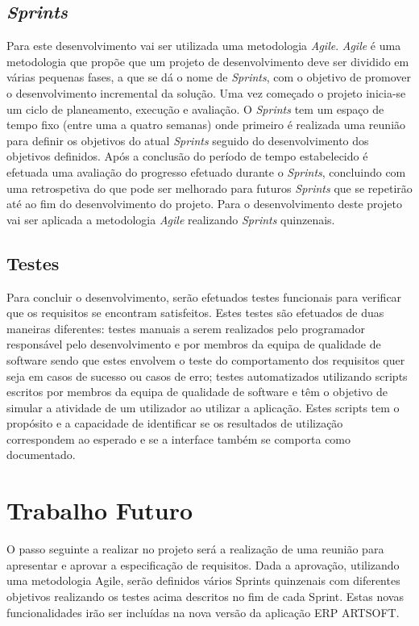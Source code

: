 \documentclass[sigplan]{acmart}
\begin{document}
\subsection{\textit{Sprints}}

Para este desenvolvimento vai ser utilizada uma metodologia \textit{Agile}. \textit{Agile} é uma metodologia que propõe que um projeto de desenvolvimento deve ser dividido em várias pequenas fases, a que se dá o nome de \textit{Sprints}, com o objetivo de promover o desenvolvimento incremental da solução. Uma vez começado o projeto inicia-se um ciclo de planeamento, execução e avaliação. O \textit{Sprints} tem um espaço de tempo fixo (entre uma a quatro semanas) onde primeiro é realizada uma reunião para definir os objetivos do atual \textit{Sprints} seguido do desenvolvimento dos objetivos definidos. Após a conclusão do período de tempo estabelecido é efetuada uma avaliação do progresso efetuado durante o \textit{Sprints}, concluindo com uma retrospetiva do que pode ser melhorado para futuros \textit{Sprints} que se repetirão até ao fim do desenvolvimento do projeto. Para o desenvolvimento deste projeto vai ser aplicada a metodologia \textit{Agile} realizando \textit{Sprints} quinzenais.


\subsection{Testes}

Para concluir o desenvolvimento, serão efetuados testes funcionais para verificar que os requisitos se encontram satisfeitos. Estes testes são efetuados de duas maneiras diferentes: testes manuais a serem realizados pelo programador responsável pelo desenvolvimento e por membros da equipa de qualidade de software sendo que estes envolvem o teste do comportamento dos requisitos quer seja em casos de sucesso ou casos de erro; testes automatizados utilizando scripts escritos por membros da equipa de qualidade de software e têm o objetivo de simular a atividade de um utilizador ao utilizar a aplicação. Estes scripts tem o propósito e a capacidade de identificar se os resultados de utilização correspondem ao esperado e se a interface também se comporta como documentado.

\section{Trabalho Futuro} \label{sec:forthcomingwork}

O passo seguinte a realizar no projeto será a realização de uma reunião para apresentar e aprovar a especificação de requisitos. Dada a aprovação, utilizando uma metodologia Agile, serão definidos vários Sprints quinzenais com diferentes objetivos realizando os testes acima descritos no fim de cada Sprint. Estas novas funcionalidades irão ser incluídas na nova versão da aplicação ERP ARTSOFT.



\end{document}
